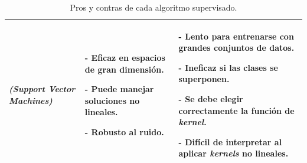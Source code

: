 \documentclass[a4paper,12pt]{article}
\begin{document}
\begin{landscape}
\begin{table}[]
\begin{tabularx}{\hsize}{|X|X|X|}
			\textit{(Support Vector Machines)}  & 
			- Eficaz en espacios de gran dimensión.
			
			- Puede manejar soluciones no lineales.
			
			- Robusto al ruido.
			& 
			- Lento para entrenarse con grandes conjuntos de datos. 
			
			- Ineficaz si las clases se superponen.
			
			- Se debe elegir correctamente la función de \textit{kernel}.
			
			- Difícil de interpretar al aplicar \textit{kernels} no lineales.
			\\ \hline
		\end{tabularx}
		\caption{Pros y contras de cada algoritmo supervisado.}
		\label{tab:pro-cons-supervised}
	\end{table}
	
\end{landscape}
\end{document}
